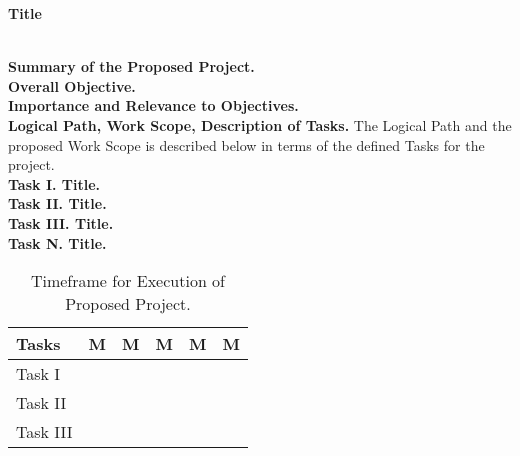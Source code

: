 \documentclass[11pt,a4paper]{article}
\begin{document}
\begin{center}\textbf{Title}\end{center}\\

\noindent\textbf{Summary of the Proposed Project.} 
\\

\noindent\textbf{Overall Objective.}
\\

\noindent\textbf{Importance and Relevance to Objectives.}
\\

\noindent\textbf{Logical Path, Work Scope, Description of Tasks.} The Logical Path and the proposed Work Scope is described below in terms of the defined Tasks for the project.
\\

\noindent\textbf{Task I. Title.}
\\

\noindent\textbf{Task II. Title.}
\\

\noindent\textbf{Task III. Title.}
\\

\noindent\textbf{Task N. Title.}

\begin{table}[h!]
    \centering
    \caption{Timeframe for Execution of Proposed Project.}
    \begin{tabular}{|l|l|l|l|l|l|}
        \hline
        \textbf{Tasks} & \textbf{M} & \textbf{M} & \textbf{M} & \textbf{M} & \textbf{M} \\
        \hline
        Task I & & & & & \\
        \hline
        Task II & & & & & \\
        \hline
        Task III & & & & & \\
        \hline
    \end{tabular}
    \label{tab-timeframe}
\end{table}

%
%
\end{document}
